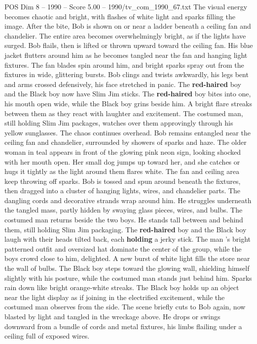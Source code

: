 \begin{textsample}{POS Dim 8 – 1990 – Score 5.00 – 1990/tv\_com\_1990\_67.txt}
The visual energy becomes chaotic and bright, with flashes of white light and sparks filling the image.
After the bite, Bob is shown on or near a ladder beneath a ceiling fan and chandelier.
The entire area becomes overwhelmingly bright, as if the lights have surged.
Bob flails, then is lifted or thrown upward toward the ceiling fan.
His blue jacket flutters around him as he becomes tangled near the fan and hanging light fixtures.
The fan blades spin around him, and bright sparks spray out from the fixtures in wide, glittering bursts.
Bob clings and twists awkwardly, his legs bent and arms crossed defensively, his face stretched in panic.
The \textbf{red-haired} boy and the Black boy now have Slim Jim sticks.
The \textbf{red-haired} boy bites into one, his mouth open wide, while the Black boy grins beside him.
A bright flare streaks between them as they react with laughter and excitement.
The costumed man, still holding Slim Jim packages, watches over them approvingly through his yellow sunglasses.
The chaos continues overhead.
Bob remains entangled near the ceiling fan and chandelier, surrounded by showers of sparks and haze.
The older woman in teal appears in front of the glowing pink neon sign, looking shocked with her mouth open.
Her small dog jumps up toward her, and she catches or hugs it tightly as the light around them flares white.
The fan and ceiling area keep throwing off sparks.
Bob is tossed and spun around beneath the fixtures, then dragged into a cluster of hanging lights, wires, and chandelier parts.
The dangling cords and decorative strands wrap around him.
He struggles underneath the tangled mass, partly hidden by swaying glass pieces, wires, and bulbs.
The costumed man returns beside the two boys.
He stands tall between and behind them, still holding Slim Jim packaging.
The \textbf{red-haired} boy and the Black boy laugh with their heads tilted back, each \textbf{holding} a jerky stick.
The man ’s bright patterned outfit and oversized hat dominate the center of the group, while the boys crowd close to him, delighted.
A new burst of white light fills the store near the wall of bulbs.
The Black boy steps toward the glowing wall, shielding himself slightly with his posture, while the costumed man stands just behind him.
Sparks rain down like bright orange-white streaks.
The Black boy holds up an object near the light display as if joining in the electrified excitement, while the costumed man observes from the side.
The scene briefly cuts to Bob again, now blasted by light and tangled in the wreckage above.
He drops or swings downward from a bundle of cords and metal fixtures, his limbs flailing under a ceiling full of exposed wires.

\end{textsample}
